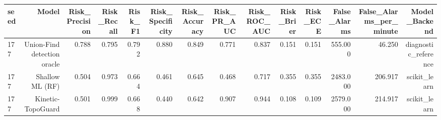\begin{tabular}{lrrrrrrrrrrrrr}
\toprule
seed & Model & Risk\_Precision & Risk\_Recall & Risk\_F1 & Risk\_Specificity & Risk\_Accuracy & Risk\_PR\_AUC & Risk\_ROC\_AUC & Risk\_Brier & Risk\_ECE & False\_Alarms & False\_Alarms\_per\_minute & Model\_Backend \\
\midrule
177 & Union-Find detection oracle & 0.788 & 0.795 & 0.792 & 0.880 & 0.849 & 0.771 & 0.837 & 0.151 & 0.151 & 555.000 & 46.250 & diagnostic\_reference \\
177 & Shallow ML (RF) & 0.504 & 0.973 & 0.664 & 0.461 & 0.645 & 0.468 & 0.717 & 0.355 & 0.355 & 2483.000 & 206.917 & scikit\_learn \\
177 & Kinetic-TopoGuard & 0.501 & 0.999 & 0.668 & 0.440 & 0.642 & 0.907 & 0.944 & 0.108 & 0.109 & 2579.000 & 214.917 & scikit\_learn \\
\bottomrule
\end{tabular}
